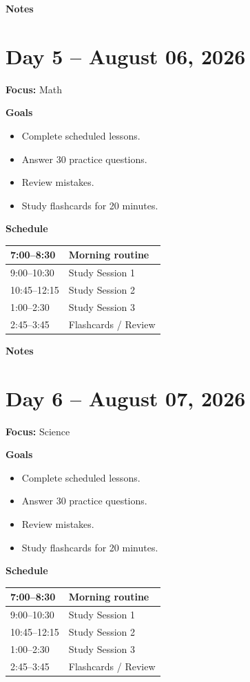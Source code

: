 \vspace{1em}
\textbf{Notes}

\vspace{8cm}

\newpage

\section*{Day 5 -- August 06, 2026}
\textbf{Focus:} Math

\textbf{Goals}
\begin{itemize}
\item Complete scheduled lessons.
\item Answer 30 practice questions.
\item Review mistakes.
\item Study flashcards for 20 minutes.
\end{itemize}

\textbf{Schedule}
\begin{tabular}{|p{4cm}|p{10cm}|}\hline
7:00--8:30 & Morning routine \\\hline
9:00--10:30 & Study Session 1 \\\hline
10:45--12:15 & Study Session 2 \\\hline
1:00--2:30 & Study Session 3 \\\hline
2:45--3:45 & Flashcards / Review \\\hline
\end{tabular}

\vspace{1em}
\textbf{Notes}

\vspace{8cm}

\newpage

\section*{Day 6 -- August 07, 2026}
\textbf{Focus:} Science

\textbf{Goals}
\begin{itemize}
\item Complete scheduled lessons.
\item Answer 30 practice questions.
\item Review mistakes.
\item Study flashcards for 20 minutes.
\end{itemize}

\textbf{Schedule}
\begin{tabular}{|p{4cm}|p{10cm}|}\hline
7:00--8:30 & Morning routine \\\hline
9:00--10:30 & Study Session 1 \\\hline
10:45--12:15 & Study Session 2 \\\hline
1:00--2:30 & Study Session 3 \\\hline
2:45--3:45 & Flashcards / Review \\\hline
\end{tabular}

